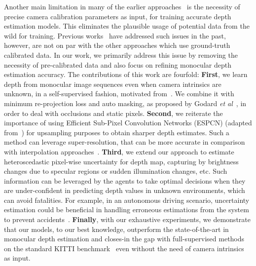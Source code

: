 \documentclass{bmvc2k}
\def\etal{\emph{et al}\bmvaOneDot}
\begin{document}
Another main limitation in many of the earlier approaches~\cite{zhou2017unsupervised, godard2019digging, yin2018geonet, casser2019depth} is the necessity of precise camera calibration parameters as input, for training accurate depth estimation models. This eliminates the plausible usage of potential data from the wild for training. Previous works~\cite{gordon2019depth, chen2019self, tosi2020distilled} have addressed such issues in the past, however, are not on par with the other approaches which use ground-truth calibrated data. In our work, we primarily address this issue by removing the necessity of pre-calibrated data and also focus on refining monocular depth estimation accuracy. The contributions of this work are fourfold: \textbf{First}, we learn depth from monocular image sequences even when camera intrinsics are unknown, in a self-supervised fashion, motivated from~\cite{gordon2019depth}. We combine it with minimum re-projection loss and auto masking, as proposed by Godard \etal~\cite{godard2019digging}, in order to deal with occlusions and static pixels. \textbf{Second}, we reiterate the importance of using Efficient Sub-Pixel Convolution Networks (ESPCN) (adapted from~\cite{shi2016real, aitken2017checkerboard}) for upsampling purposes to obtain sharper depth estimates. Such a method can leverage super-resolution, that can be more accurate in comparison with interpolation approaches~\cite{shi2016real}. \textbf{Third}, we extend our approach to estimate heteroscedastic pixel-wise uncertainty for depth map, capturing by brightness changes due to specular regions or sudden illumination changes, etc. Such information can be leveraged by the agents to take optimal decisions when they are under-confident in predicting depth values in unknown environments, which can avoid fatalities. For example, in an autonomous driving scenario, uncertainty estimation could be beneficial in handling erroneous estimations from the system to prevent accidents~\cite{poggi2020uncertainty}. \textbf{Finally}, with our exhaustive experiments, we demonstrate that our models, to our best knowledge, outperform the state-of-the-art in monocular depth estimation and closes-in the gap with full-supervised methods on the standard KITTI benchmark~\cite{geiger2013vision} even without the need of camera intrinsics as input.


\vspace{-10pt}
\end{document}
